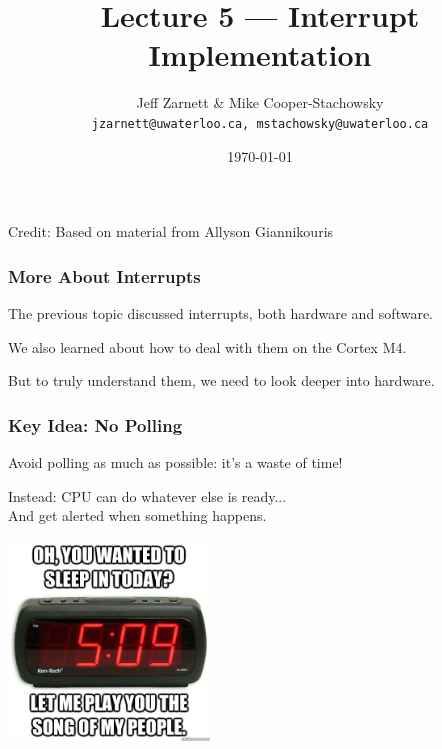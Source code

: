 

\title{Lecture 5 --- Interrupt Implementation }

\author{Jeff Zarnett \& Mike Cooper-Stachowsky \\ \small \texttt{jzarnett@uwaterloo.ca, mstachowsky@uwaterloo.ca}}
\date{\today}





\begin{frame}
  \titlepage
  
  \small{Credit: Based on material from Allyson Giannikouris}

 \end{frame}

\begin{frame}
\frametitle{More About Interrupts}

The previous topic discussed interrupts, both hardware and software.

We also learned about how to deal with them on the Cortex M4.

But to truly understand them, we need to look deeper into hardware.

\end{frame}

\begin{frame}
\frametitle{Key Idea: No Polling}

Avoid polling as much as possible: it's a waste of time!

Instead: CPU can do whatever else is ready...\\
\quad And get alerted when something happens. 

\begin{center}
	\includegraphics[width=0.4\textwidth]{images/alarmclock.jpg}
\end{center}

\end{frame}

